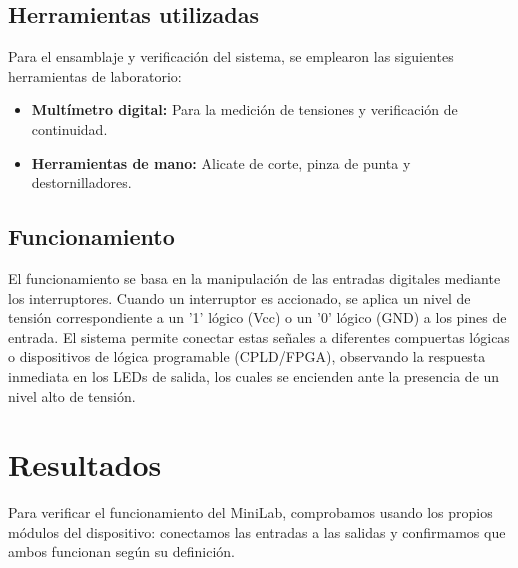 \documentclass[12pt,a4paper]{article}
\begin{document}
\subsection{Herramientas utilizadas}
Para el ensamblaje y verificación del sistema, se emplearon las siguientes herramientas de laboratorio:
\begin{itemize}
	\item \textbf{Multímetro digital:} Para la medición de tensiones y verificación de continuidad.
	\item \textbf{Herramientas de mano:} Alicate de corte, pinza de punta y destornilladores.
\end{itemize}


\subsection{Funcionamiento}
	El funcionamiento se basa en la manipulación de las entradas digitales mediante los interruptores. Cuando un interruptor es accionado, se aplica un nivel de tensión correspondiente a un '1' lógico (Vcc) o un '0' lógico (GND) a los pines de entrada. El sistema permite conectar estas señales a diferentes compuertas lógicas o dispositivos de lógica programable (CPLD/FPGA), observando la respuesta inmediata en los LEDs de salida, los cuales se encienden ante la presencia de un nivel alto de tensión.
\section{Resultados}


Para verificar el funcionamiento del MiniLab, comprobamos usando los propios módulos del dispositivo: conectamos las entradas a las salidas y confirmamos que ambos funcionan según su definición. 
\end{document}
